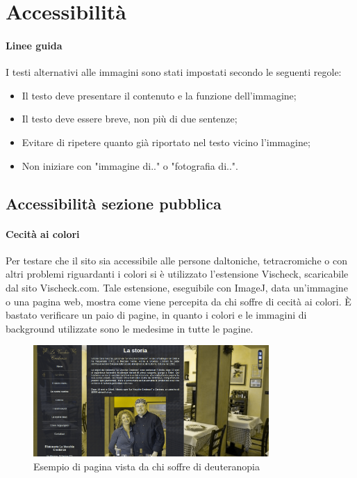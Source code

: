 \section{Accessibilità}

\paragraph{Linee guida}

I testi alternativi alle immagini sono stati impostati secondo le seguenti regole:
\begin{itemize}

\item Il testo deve presentare il contenuto e la funzione dell'immagine;
\item Il testo deve essere breve, non più di due sentenze;
\item Evitare di ripetere quanto già riportato nel testo vicino l'immagine;
\item Non iniziare con "immagine di.." o "fotografia di..".
\end{itemize}

\subsection{Accessibilità sezione pubblica}

\paragraph{Cecità ai colori}
Per testare che il sito sia accessibile alle persone daltoniche, tetracromiche o con altri problemi riguardanti i colori si è utilizzato l'estensione Vischeck, scaricabile dal sito Vischeck.com. Tale estensione, eseguibile con ImageJ, data un'immagine o una pagina web, mostra come viene percepita da chi soffre di cecità ai colori. È bastato verificare un paio di pagine, in quanto i colori e le immagini di background utilizzate sono le medesime in tutte le pagine.

\begin{figure}[H]
		\centering \includegraphics[width=0.8\textwidth]{images/color1.png}
		\caption{Esempio di pagina vista da chi soffre di deuteranopia}
\end{figure}
	
